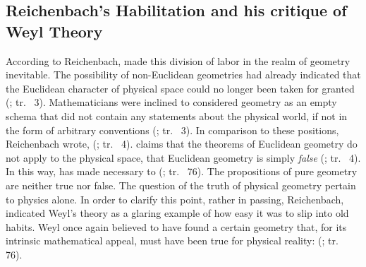 \documentclass[draft]{article}
\newcommand{\WT}{Weyl's theory\xspace}
\newcommand{\rhp}[2]{(\cite[#1]{Reichenbach1920a}; tr.\ \citeyear{Reichenbach1969} #2)\xspace}
\begin{document}





\subsection{Reichenbach's Habilitation and his critique of Weyl Theory}

According to Reichenbach, \rt made this division of labor in the realm of geometry inevitable. The possibility of non-Euclidean geometries had already indicated that the  Euclidean character of physical space could no longer been taken for granted \rhp{3}{3}. Mathematicians were inclined to considered geometry as an empty schema that did not contain any statements about the physical world, if not in the form of arbitrary conventions \rhp{3}{3}. In comparison to these positions, Reichenbach wrote,  \rhp{3}{4}. \Rt claims that the theorems of Euclidean geometry do not apply to the physical space, that Euclidean geometry is simply \emph{false} \rhp{3}{4}. In this way, \rt has made necessary to  \rhp{73}{76}. The propositions of pure geometry are neither true nor false. The question of the truth of physical geometry pertain to physics alone. In order to clarify this point, rather in passing, Reichenbach, indicated \WT as a glaring example of how easy it was to slip into old habits. Weyl once again believed to have found a certain geometry that, for its intrinsic mathematical appeal, must have been true for physical reality:  \rhp{73}{76}.
\end{document}

